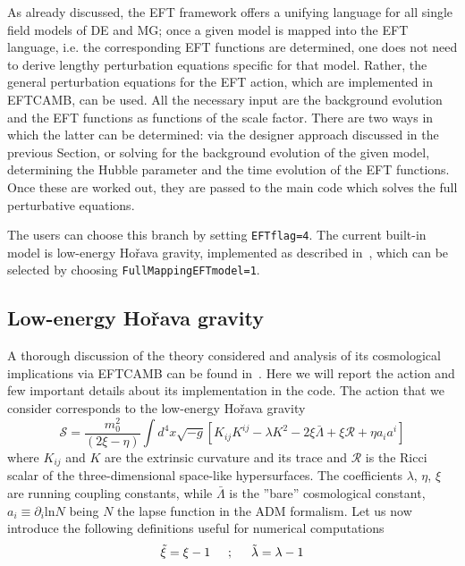 \documentclass[prd,nofootinbib,showpacs]{revtex4}
\def\be{\begin{equation}}
\def\ee{\end{equation}}
\def\f{\frac}
\begin{document}
{As already discussed, the EFT framework offers a unifying language for all single field models of DE and MG; once a given model is mapped into the EFT language, i.e. the corresponding EFT functions are determined, one does not need to derive  lengthy  perturbation equations specific for that model. Rather, the general perturbation equations for the EFT action, which are implemented in EFTCAMB, can be used. All the necessary input are the background evolution and the EFT functions as functions of the scale factor. There are two ways in which the latter can be determined: via the designer approach discussed in the previous Section, or solving for the background evolution of the given model, determining the Hubble parameter and  the time evolution of the EFT functions. Once these are worked out, they are passed to the main code  which solves  the full perturbative equations.

The users can choose this branch by setting \verb|EFTflag=4|. The current built-in model is low-energy Ho\v rava gravity, implemented as described in~\cite{Frusciante:2015maa}, which can be selected by choosing \verb|FullMappingEFTmodel=1|.

\subsection{Low-energy Ho\v rava gravity}\label{Horava}

A thorough discussion of the theory considered and  analysis of its cosmological implications via EFTCAMB can be found in~\cite{Frusciante:2015maa}. Here we will report the action and few important details about its implementation in the code. The action that we consider corresponds to  the low-energy Ho\v rava gravity~\cite{Blas:2009qj}
\be\label{Horavaaction}
\mathcal{S}=\f{m_0^2}{(2\xi-\eta)}\int{}d^4x\sqrt{-g}\left[K_{ij}K^{ij}-\lambda K^2 -2 \xi\bar{\Lambda}+\xi \mathcal{R}+\eta a_i a^i\right]
\ee
where $K_{ij}$ and $K$ are the extrinsic curvature and its trace and $\mathcal{R}$ is the  Ricci scalar of the three-dimensional space-like hypersurfaces. The coefficients $\lambda$, $\eta$, $\xi$  are running coupling constants, while $\bar{\Lambda}$ is the ''bare'' cosmological constant,  $a_i \equiv \partial_i \mbox{ln} N$ being $N$ the lapse function in the ADM formalism. 
Let us now introduce the following definitions useful for numerical computations
\begin{align}
\tilde{\xi} = \xi - 1  \hspace{0.5cm};\hspace{0.5cm} \tilde{\lambda} = \lambda -1   
\label{redef}
\end{align}

}
\end{document}
